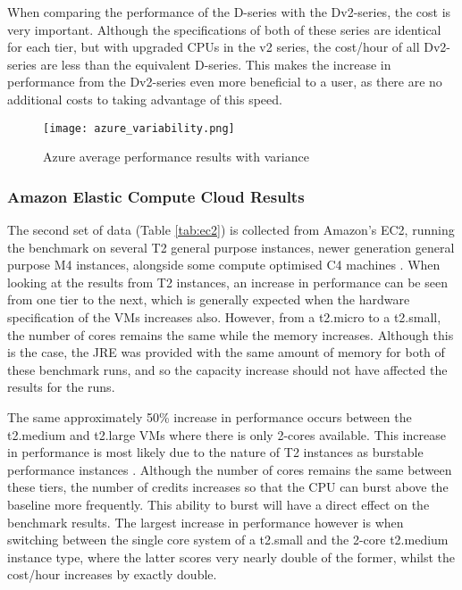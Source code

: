 \documentclass{llncs}
\begin{document}
When comparing the performance of the D-series with the Dv2-series, the cost is very important. Although the specifications of both of these series are identical for each tier, but with upgraded CPUs in the v2 series, the cost/hour of all Dv2-series are less than the equivalent D-series. This makes the increase in performance from the Dv2-series even more beneficial to a user, as there are no additional costs to taking advantage of this speed.



\begin{figure}[ht]
  \centering
  \texttt{[image: azure\_variability.png]}
  \caption{Azure average performance results with variance}
  \label{fig:azurevariability}
\end{figure}

\subsubsection{Amazon Elastic Compute Cloud Results}\label{sec:eval:awsresults}

The second set of data (Table \ref{tab:ec2}) is collected from Amazon's EC2, running the benchmark on several T2 general purpose instances, newer generation general purpose M4 instances, alongside some compute optimised C4 machines \cite{awsvmtype}. When looking at the results from T2 instances, an increase in performance can be seen from one tier to the next, which is generally expected when the hardware specification of the VMs increases also. However, from a t2.micro to a t2.small, the number of cores remains the same while the memory increases. Although this is the case, the JRE was provided with the same amount of memory for both of these benchmark runs, and so the capacity increase should not have affected the results for the runs.

The same approximately 50\% increase in performance occurs between the t2.medium and t2.large VMs where there is only 2-cores available. This increase in performance is most likely due to the nature of T2 instances as burstable performance instances \cite{awsvmtype}. Although the number of cores remains the same between these tiers, the number of credits increases so that the CPU can burst above the baseline more frequently. This ability to burst will have a direct effect on the benchmark results. The largest increase in performance however is when switching between the single core system of a t2.small and the 2-core t2.medium instance type, where the latter scores very nearly double of the former, whilst the cost/hour increases by exactly double.
\end{document}
